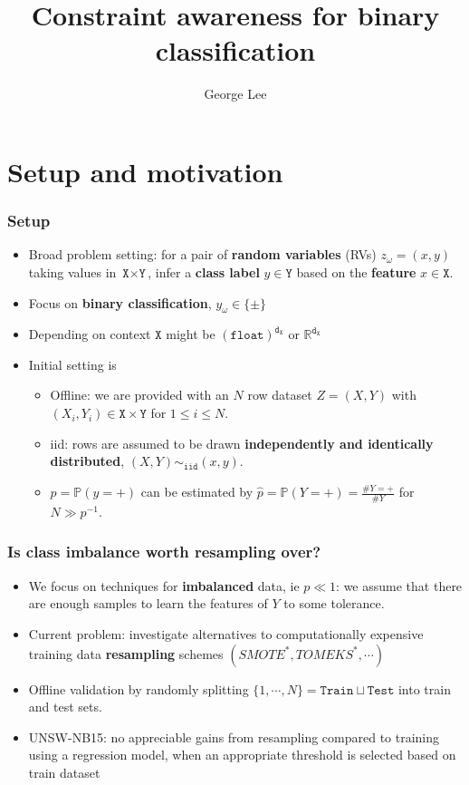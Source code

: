 \documentclass{beamer}
\title{Constraint awareness for binary classification}
\subtitle{George Lee}
\newcommand{\IN}{{\texttt{X}}}
\newcommand{\OUT}{{\texttt{Y}}}
\newcommand{\DIM}{{\texttt{d}}}
\newcommand{\TWO}{\{\pm\}}
\newcommand{\TRN}{{\texttt{Train}}}
\newcommand{\TST}{{\texttt{Test}}}
\newcommand{\Prob}{{\mathbb P}}
\newcommand{\ProbH}{{\widehat{\mathbb P}}}
\begin{document}
\begin{frame}
\titlepage
\end{frame}

\section{Setup and motivation}
\begin{frame}
\frametitle{Setup}
\begin{itemize}
\item
  Broad problem setting: for a pair of \textbf{random variables} (RVs) $z_\omega=(x,y)$ taking values in $\IN\times\OUT$, infer a \textbf{class label} $y\in\OUT$ based on the \textbf{feature} $x\in\IN$.
\item
  Focus on \textbf{binary classification}, $y_\omega\in\TWO$
\item
  Depending on context $\IN$ might be $\left(\texttt{float}\right)^{\DIM_\IN}$ or $\mathbb R^{\DIM_\IN}$
\item Initial setting is
    \begin{itemize}
\item
  Offline: we are provided with an $N$ row dataset $Z=(X,Y)$ with $(X_i,Y_i)\in\IN\times\OUT$ for $1\leq i\leq N$.
\item
  iid: rows are assumed to be drawn \textbf{independently and identically distributed}, $(X,Y)\sim_{\texttt{iid}}(x,y)$.
\item
  $p=\Prob(y=+)$ can be estimated by $\hat p=\ProbH(Y=+)=\tfrac{\#Y=+}{\#Y}$ for $N\gg p^{-1}$.
    \end{itemize}
\end{itemize}
\end{frame}
\begin{frame}
\frametitle{Is class imbalance worth resampling over?}
\begin{itemize}
\item
  We focus on techniques for \textbf{imbalanced} data, ie $p\ll1$: we assume that there are enough samples to learn the features of $Y$ to some tolerance.
\item
  Current problem: investigate alternatives to computationally expensive training data \textbf{resampling} schemes $(SMOTE^*,TOMEKS^*,\cdots)$
\item
Offline validation by randomly splitting $\{1,\cdots,N\}=\TRN\sqcup\TST$ into train and test sets.
\item
  UNSW-NB15: no appreciable gains from resampling compared to training using a regression model, when an appropriate threshold is selected based on train dataset
\end{itemize}
\end{frame}
\end{document}
